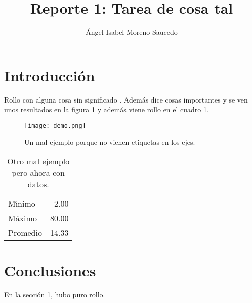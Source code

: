 \documentclass{article} %
\title{Reporte 1: Tarea de cosa tal} %
\author{\'{A}ngel Isabel Moreno Saucedo} %
\begin{document}
\maketitle %

\section{Introducci\'{o}n}\label{intro} %

Rollo con alguna cosa sin significado \citep{libro}.
Adem\'{a}s \citet{art} dice cosas importantes y se ven unos resultados
en la figura \ref{fig} y adem\'{a}s viene rollo en el cuadro \ref{datos}.

\begin{figure}
  \centering\texttt{[image: demo.png]}
  \caption{Un mal ejemplo porque no vienen etiquetas en los ejes.}
  \label{fig}
\end{figure}

\begin{table}
  \caption{Otro mal ejemplo pero ahora con datos.}
  \label{datos}
  \begin{center}
    \begin{tabular}{lr}
      M\'{\i}nimo & 2.00 \\
      M\'{a}ximo & 80.00 \\
      Promedio & 14.33
    \end{tabular}
  \end{center}
\end{table}

\section{Conclusiones}

En la secci\'{o}n \ref{intro}, hubo puro rollo. \citep{armella2002instrumentos}



\end{document}
